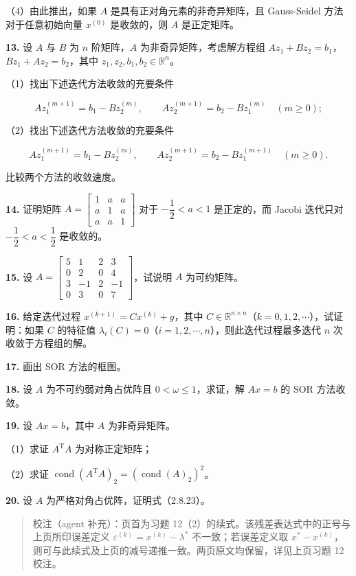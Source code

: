 \documentclass[
  10pt,
  fontset=fandol]{ctexart}
\begin{document}
（4）由此推出，如果 \(A\) 是具有正对角元素的非奇异矩阵，且 Gauss-Seidel 方法对于任意初始向量 \(x^{(0)}\) 是收敛的，则 \(A\) 是正定矩阵。

\textbf{13.} 设 \(A\) 与 \(B\) 为 \(n\) 阶矩阵，\(A\) 为非奇异矩阵，考虑解方程组 \(Az_1+Bz_2=b_1\)，\(Bz_1+Az_2=b_2\)，其中 \(z_1,z_2,b_1,b_2\in\mathbb R^n\)。

（1）找出下述迭代方法收敛的充要条件

\[
Az_1^{(m+1)}=b_1-Bz_2^{(m)},\qquad Az_2^{(m+1)}=b_2-Bz_1^{(m)}\quad(m\geqslant0);
\]

（2）找出下述迭代方法收敛的充要条件

\[
Az_1^{(m+1)}=b_1-Bz_2^{(m)},\qquad Az_2^{(m+1)}=b_2-Bz_1^{(m+1)}\quad(m\geqslant0).
\]

比较两个方法的收敛速度。

\textbf{14.} 证明矩阵 \(A=\begin{bmatrix}1&a&a\\a&1&a\\a&a&1\end{bmatrix}\) 对于 \(-\dfrac12<a<1\) 是正定的，而 Jacobi 迭代只对 \(-\dfrac12<a<\dfrac12\) 是收敛的。

\textbf{15.} 设 \(A=\begin{bmatrix}5&1&2&3\\0&2&0&4\\3&-1&2&-1\\0&3&0&7\end{bmatrix}\)，试说明 \(A\) 为可约矩阵。

\textbf{16.} 给定迭代过程 \(x^{(k+1)}=Cx^{(k)}+g\)，其中 \(C\in\mathbb R^{n\times n}\)（\(k=0,1,2,\cdots\)），试证明：如果 \(C\) 的特征值 \(\lambda_i(C)=0\)（\(i=1,2,\cdots,n\)），则此迭代过程最多迭代 \(n\) 次收敛于方程组的解。

\textbf{17.} 画出 SOR 方法的框图。

\textbf{18.} 设 \(A\) 为不可约弱对角占优阵且 \(0<\omega\leqslant1\)，求证，解 \(Ax=b\) 的 SOR 方法收敛。

\textbf{19.} 设 \(Ax=b\)，其中 \(A\) 为非奇异矩阵。

（1）求证 \(A^{\mathrm T}A\) 为对称正定矩阵；

（2）求证 \(\operatorname{cond}(A^{\mathrm T}A)_2=(\operatorname{cond}(A)_2)^2\)。

\textbf{20.} 设 \(A\) 为严格对角占优阵，证明式（2.8.23）。

\begin{quote}
校注（agent 补充）：页首为习题 12（2）的续式。该残差表达式中的正号与上页所印误差定义 \(\varepsilon^{(k)}=x^{(k)}-\lambda^*\) 不一致；若误差定义取 \(x^*-x^{(k)}\)，则可与此续式及上页的减号递推一致。两页原文均保留，详见上页习题 12 校注。
\end{quote}
\end{document}
